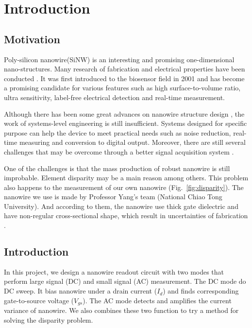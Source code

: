\chapter{Introduction}
\section{Motivation}
Poly-silicon nanowire(SiNW) is an interesting and promising one-dimensional nano-structures.
Many research of fabrication and electrical properties have been conducted \cite{C25th}.
It was first introduced to the biosensor field in 2001\cite{C2001} and has become a promising candidate for various features such as high surface-to-volume ratio, ultra sensitivity, label-free electrical detection and  real-time measurement.

Although there has been some great advances on nanowire structure design \cite{R1}, the work of systems-level engineering is still insufficient.
Systems designed for specific purpose can help the device to meet practical needs such as noise reduction, real-time measuring and conversion to digital output.
Moreover, there are still several challenges that may be overcome through a better signal acquisition system \cite{R1}.

One of the challenges is that the mass production of robust nanowire is still improbable.
Element disparity may be a main reason among others.
This problem also happens to the measurement of our own nanowire (Fig.~\ref{fig:disparity}).
The nanowire we use is made by Professor Yang's team (National Chiao Tong University).
And according to them, the nanowire use thick gate dielectric and have non-regular cross-sectional shape, which result in uncertainties of fabrication \cite{C6}.


\section{Introduction}
In this project, we design a nanowire readout circuit with two modes that perform large signal (DC) and small signal (AC) measurement.
The DC mode do DC sweep.
It bias nanowire under a drain current ($I_d$) and finds corresponding gate-to-source voltage ($V_{gs}$).
The AC mode detects and amplifies the current variance of nanowire.
We also combines these two function to try a method for solving the disparity problem.

